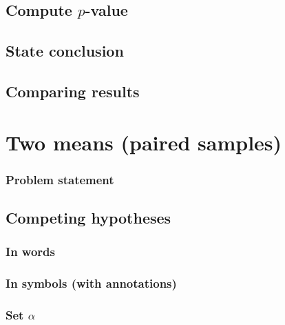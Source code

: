 \documentclass[
  12pt, krantz2,
]{krantz}
\begin{document}
\hypertarget{compute-p-value-1}{%
\subsection{\texorpdfstring{Compute \(p\)-value}{Compute p-value}}\label{compute-p-value-1}}

\hypertarget{state-conclusion-3}{%
\subsection{State conclusion}\label{state-conclusion-3}}

\hypertarget{comparing-results-3}{%
\subsection{Comparing results}\label{comparing-results-3}}

\hypertarget{two-means-paired-samples}{%
\section{Two means (paired samples)}\label{two-means-paired-samples}}

\hypertarget{problem-statement-4}{%
\subsubsection*{Problem statement}\label{problem-statement-4}}


\hypertarget{competing-hypotheses-4}{%
\subsection{Competing hypotheses}\label{competing-hypotheses-4}}

\hypertarget{in-words-4}{%
\subsubsection*{In words}\label{in-words-4}}


\hypertarget{in-symbols-with-annotations-4}{%
\subsubsection*{In symbols (with annotations)}\label{in-symbols-with-annotations-4}}


\hypertarget{set-alpha-4}{%
\subsubsection*{\texorpdfstring{Set \(\alpha\)}{Set \textbackslash alpha}}\label{set-alpha-4}}
\end{document}

